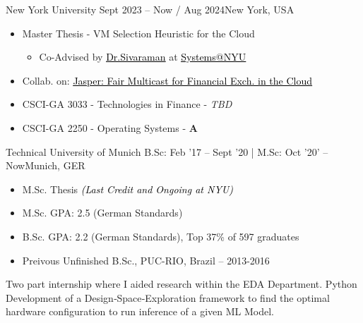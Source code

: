 \documentclass[10pt,a4paper,ragged2e,withhyper]{altacv}
\begin{document}
\begin{paracol}{2}

        {New York University}
        {Sept 2023 -- Now / Aug 2024}{New York, USA}
\begin{itemize}
\item Master Thesis - VM Selection Heuristic for the Cloud    
    \begin{itemize}
        \item Co-Advised by \href{https://anirudhsk.github.io/}{{\textcolor{black}{\underline{Dr.Sivaraman}}}} at \href{https://news.cs.nyu.edu/}{{\textcolor{black}{\underline{Systems@NYU}}}}
    \end{itemize}
\item Collab. on: \href{https://arxiv.org/abs/2402.09527}{{\textcolor{black}{\underline{Jasper: Fair Multicast for Financial Exch. in the Cloud}}}}
\item CSCI-GA 3033  - Technologies in Finance - \textit{TBD}
\item CSCI-GA 2250  - Operating Systems - \textbf{A}
\end{itemize}

\divider

        {Technical University of Munich}
        {B.Sc: Feb '17 -- Sept '20 | M.Sc: Oct '20' -- Now}{Munich, GER}
\begin{itemize}
    \item M.Sc. Thesis {\textcolor{black}{\textit{(Last Credit and Ongoing at NYU)}}}
\item M.Sc. GPA: 2.5 (German Standards) 
\item B.Sc.  GPA: 2.2 (German Standards), Top 37\% of 597 graduates
\item Preivous Unfinished B.Sc., PUC-RIO, Brazil -- 2013-2016
\end{itemize}
\divider


Two part internship where I aided research within the EDA Department. Python Development of a Design‑Space‑Exploration 
framework to find the optimal hardware configuration to run inference of a given ML Model.


\end{paracol}
\end{document}
